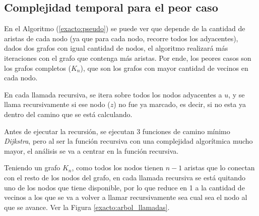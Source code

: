 \subsection{Complejidad temporal para el peor caso} \label{exacto:complejidad}

En el Algoritmo (\ref{exacto:pseudo}) se puede ver que depende de la cantidad de aristas de cada nodo (ya que para cada nodo, recorre todos los adyacentes), dados dos grafos
con igual cantidad de nodos, el algoritmo realizar\'a m\'as iteraciones con el grafo que contenga m\'as aristas. Por ende, los peores casos son los grafos completos ($K_n$),
que son los grafos con mayor cantidad de vecinos en cada nodo.

En cada llamada recursiva, se itera sobre todos los nodos adyacentes a $u$, y se llama recursivamente si ese nodo ($z$) no fue ya marcado, es decir, si no esta ya dentro del camino que se est\'a calculando.

Antes de ejecutar la recursi\'on, se ejecutan 3 funciones de camino m\'inimo \emph{Dijkstra}, pero al ser la funci\'on recursiva con una complejidad algor\'itmica mucho mayor, el an\'alisis se va a centrar en la funci\'on recursiva.

Teniendo un grafo $K_n$, como todos los nodos tienen $n - 1$ aristas que lo conectan con el resto de los nodos del grafo, en cada llamada recursiva se est\'a quitando uno de los nodos que tiene disponible, por lo que reduce en 1 a la cantidad de vecinos a los que se va a volver a llamar recursivamente sea cual sea el nodo al que se avance. Ver la Figura \ref{exacto:arbol_llamadas}.

